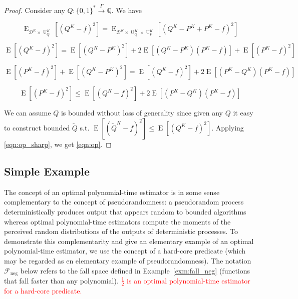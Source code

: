 \documentclass[11pt]{article}
\numberwithin{equation}{section}
\theoremstyle{definition}
\theoremstyle{plain}
\newcommand{\Bool}{\{0,1\}}
\newcommand{\Words}{{\Bool^*}}
\DeclareMathOperator{\E}{E}
\DeclareMathOperator{\Un}{U}
\newcommand{\Rats}{\mathbb{Q}}
\newcommand{\Dist}{\mathcal{D}}
\newcommand{\Fall}{\mathcal{F}}
\newcommand{\Scheme}{\xrightarrow{\Gamma}}
\begin{document}
\begin{proof}

Consider any $Q: \Words \Scheme \Rats$. We have

$$\E_{\Dist^{K} \times \Un_Q^{K}}[(Q^{K}-f)^2]=\E_{\Dist^{K} \times \Un_Q^{K} \times \Un_P^{K}}[(Q^{K}-P^{K}+P^{K}-f)^2]$$

$$\E[(Q^{K}-f)^2]=\E[(Q^{K}-P^{K})^2]+2\E[(Q^{K}-P^{K})(P^{K}-f)]+\E[(P^{K}-f)^2]$$

$$\E[(P^{K}-f)^2]+\E[(Q^{K}-P^{K})^2]=\E[(Q^{K}-f)^2]+2\E[(P^{K}-Q^{K})(P^{K}-f)]$$

$$\E[(P^{K}-f)^2] \leq \E[(Q^{K}-f)^2] + 2\E[(P^{K}-Q^{K})(P^{K}-f)]$$

We can assume $Q$ is bounded without loss of generality since given any $Q$ it easy to construct bounded $\tilde{Q}$ s.t. $\E[(\tilde{Q}^{K}-f)^2] \leq \E[(Q^{K}-f)^2]$. Applying \ref{eqn:op_sharp}, we get \ref{eqn:op}.

\end{proof}

\subsection{Simple Example}
\label{sec:fundamentals__one_way}

The concept of an optimal polynomial-time estimator is in some sense complementary to the concept of pseudorandomness: a pseudorandom process deterministically produces output that appears random to bounded algorithms whereas optimal polynomial-time estimators compute the moments of the perceived random distributions of the outputs of deterministic processes. To demonstrate this complementarity and give an elementary example of an optimal polynomial-time estimator, we use the concept of a hard-core predicate (which may be regarded as en elementary example of pseudorandomness). The notation $\Fall_\text{neg}$ below refers to the fall space defined in Example~\ref{exm:fall_neg} (functions that fall faster than any polynomial). \textcolor{red}{$\frac{1}{2}$ is an optimal polynomial-time estimator for a hard-core predicate.}
\end{document}
